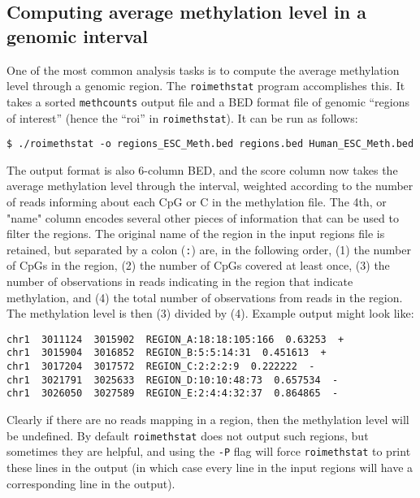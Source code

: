 \documentclass[10pt]{article}
\newcommand{\prog}[1]{\texttt{#1}}
\newcommand{\lit}[1]{\texttt{#1}}
\newcommand{\op}[1]{\texttt{#1}}
\begin{document}

\subsection{Computing average methylation level in a genomic interval}
\label{sec:roimethstat}

One of the most common analysis tasks is to compute the average
methylation level through a genomic region. The \prog{roimethstat}
program accomplishes this. It takes a sorted \prog{methcounts} output file
and a BED format file of genomic ``regions of interest'' (hence the
``roi'' in \prog{roimethstat}). It can be run as follows:
\begin{verbatim}
$ ./roimethstat -o regions_ESC_Meth.bed regions.bed Human_ESC_Meth.bed
\end{verbatim}
The output format is also 6-column BED, and the score column now takes
the average methylation level through the interval, weighted according
to the number of reads informing about each CpG or C in the
methylation file. The 4th, or "name" column encodes several other
pieces of information that can be used to filter the regions. The
original name of the region in the input regions file is retained, but
separated by a colon (\lit{:}) are, in the following order, (1) the
number of CpGs in the region, (2) the number of CpGs covered at least
once, (3) the number of observations in reads indicating in the region
that indicate methylation, and (4) the total number of observations
from reads in the region. The methylation level is then (3) divided by
(4). Example output might look like:
\begin{verbatim}
chr1  3011124  3015902  REGION_A:18:18:105:166  0.63253  +
chr1  3015904  3016852  REGION_B:5:5:14:31  0.451613  +
chr1  3017204  3017572  REGION_C:2:2:2:9  0.222222  -
chr1  3021791  3025633  REGION_D:10:10:48:73  0.657534  -
chr1  3026050  3027589  REGION_E:2:4:4:32:37  0.864865  -
\end{verbatim}
Clearly if there are no reads mapping in a region, then the
methylation level will be undefined. By default \prog{roimethstat}
does not output such regions, but sometimes they are helpful, and
using the \op{-P} flag will force \prog{roimethstat} to print these
lines in the output (in which case every line in the input regions
will have a corresponding line in the output).
\end{document}
